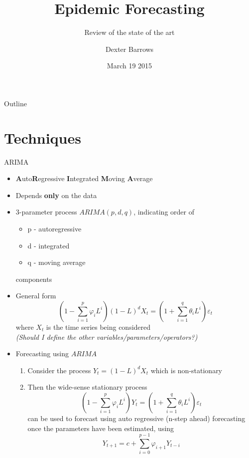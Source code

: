 \documentclass[10pt]{beamer}
\title[Epidemic Forecasting]
{Epidemic Forecasting}
\subtitle
{Review of the state of the art}
\author{Dexter Barrows}
\institute[McMaster University]
{
  Department of Mathematics and Statistics\\
  McMaster University
}
\date[Presentation]
{March 19 2015}
\begin{document}
		\begin{frame}[t,plain]
			\maketitle
		\end{frame}

		\begin{frame}{Outline}
		  	\tableofcontents
		\end{frame}


	\section{Techniques}

		\begin{frame}[allowframebreaks]{ARIMA}
			\begin{itemize}
				\item {\bf A}uto{\bf R}egressive {\bf I}ntegrated {\bf M}oving {\bf A}verage
				\item Depends {\bf only} on the data
				\item 3-parameter process $ARIMA(p,d,q)$, indicating order of
					\begin{itemize}
						\item p - autoregressive
						\item d - integrated
						\item q - moving average
					\end{itemize}
					components
				\item General form
					\begin{equation*}
						\left( 1 - \sum_{i=1}^{p} \varphi_i L^i \right) (1-L)^d X_t = \left( 1 + \sum_{i=1}^{q} \theta_i L^i \right) \varepsilon_t
					\end{equation*}
					where $X_t$ is the time series being considered\\
					{\it (Should I define the other variables/parameters/operators?)}

				\framebreak
				\item Forecasting using $ARIMA$
					\begin{enumerate}
						\item Consider the process $Y_t = (1-L)^d X_t$ which is non-stationary
						\item Then the wide-sense stationary process
							\begin{equation*}
								\left( 1 - \sum_{i=1}^{p} \varphi_i L^i \right) Y_t = \left( 1 + \sum_{i=1}^{q} \theta_i L^i \right) \varepsilon_t
							\end{equation*}
							can be used to forecast using auto regressive (n-step ahead) forecasting once the parameters have been estimated, using
							\begin{equation*}
								Y_{t+1} = c + \sum_{i=0}^{p-1} \varphi_{i+1} Y_{t-i}
							\end{equation*}
					\end{enumerate}
			\end{itemize}
		\end{frame}
\end{document}
